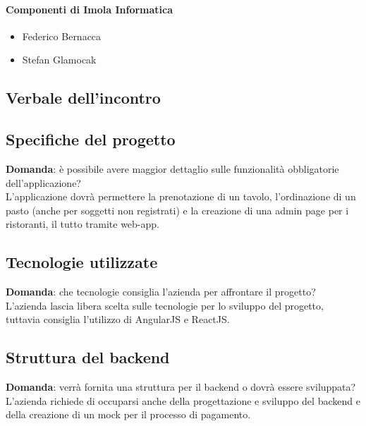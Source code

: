 \documentclass[italian,12pt]{article} %
\begin{document}
\paragraph{Componenti di Imola Informatica}

\begin{itemize}
	\item Federico Bernacca
	\item Stefan Glamocak
\end{itemize}

\newpage

\begin{flushleft}
\section{Verbale dell'incontro}

\subsection{Specifiche del progetto}
	\textbf{Domanda}: è possibile avere maggior dettaglio sulle funzionalità obbligatorie dell'applicazione?\\
	L'applicazione dovrà permettere la prenotazione di un tavolo, l'ordinazione di un pasto (anche per soggetti non registrati) e la creazione di una admin page per i ristoranti, il tutto tramite web-app.\\
\subsection{Tecnologie utilizzate}
	\textbf{Domanda}: che tecnologie consiglia l'azienda per affrontare il progetto?\\
	L'azienda lascia libera scelta sulle tecnologie per lo sviluppo del progetto, tuttavia consiglia l'utilizzo di AngularJS e ReactJS. \\
\subsection{Struttura del backend}
	\textbf{Domanda}: verrà fornita una struttura per il backend o dovrà essere sviluppata?\\
	L'azienda richiede di occuparsi anche della progettazione e sviluppo del backend e della creazione di un mock per il processo di pagamento.\\


\end{flushleft}
\end{document}
